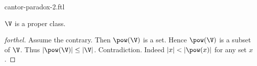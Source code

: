 \documentclass{naproche-library}
\begin{document}
\begin{smodule}{cantor-paradox-2.ftl}

  \begin{theorem*}[forthel,title=Cantor's Second Paradox,id=cantor_paradox_2]
    $\V$ is a proper class.
  \end{theorem*}
  \begin{proof}[forthel]
    Assume the contrary.
    Then $\pow(\V)$ is a set.
    Hence $\pow(\V)$ is a subset of $\V$.
    Thus $|\pow(\V)| \leq |\V|$.
    Contradiction.
    Indeed $|x| < |\pow(x)|$ for any set $x$.
  \end{proof}
\end{smodule}
\end{document}
